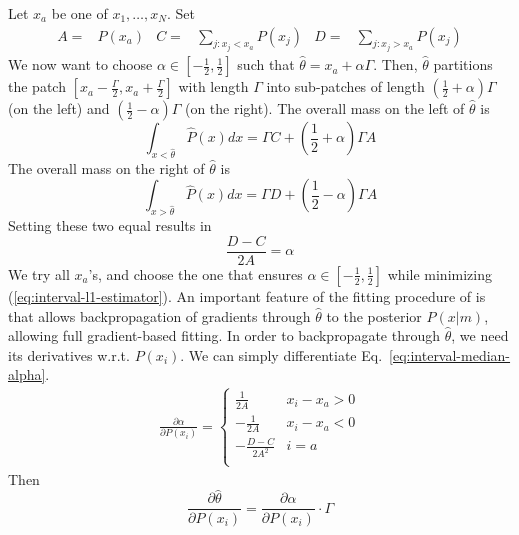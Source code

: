 Let $x_a$ be one of $x_1, \dots, x_N$.
Set
\begin{align*}
    A =& P(x_a) &
    C =& \sum_{j : x_j < x_a} P(x_j)&
    D =& \sum_{j : x_j>x_a} P(x_j)
\end{align*}
We now want to choose $\alpha \in [-\frac{1}{2},\frac{1}{2}]$ such that $\widehat{\theta} = x_a + \alpha\Gamma$.
Then, $\widehat{\theta}$ partitions the patch $[x_a-\frac{\Gamma}{2}, x_a+\frac{\Gamma}{2}]$ with length $\Gamma$ into sub-patches of length $(\frac{1}{2}+\alpha) \Gamma$ (on the left) and $(\frac{1}{2}-\alpha) \Gamma$ (on the right).
The overall mass on the left of $\widehat{\theta}$ is
\begin{equation}
  \int_{x<\widehat{\theta}} \widehat{P}(x) dx  =  \Gamma C + \left(\frac{1}{2}+\alpha\right) \Gamma A %
\end{equation}
The overall mass on the right of $\widehat{\theta}$ is
\begin{equation}
  \int_{x>\widehat{\theta}} \widehat{P}(x) dx =   \Gamma D + \left(\frac{1}{2}-\alpha\right) \Gamma A %
\end{equation}
Setting these two equal results in
\begin{equation}\label{eq:interval-median-alpha}
    \frac{D-C}{2A} =   \alpha
\end{equation}
We try all $x_a$'s, and choose the one that ensures $\alpha \in [-\frac{1}{2}, \frac{1}{2}]$ while minimizing (\ref{eq:interval-l1-estimator}). 
An important feature of the fitting procedure of \citet{hahn2024unifying} is that allows backpropagation of gradients through $\widehat{\theta}$ to the posterior $P(x|m)$, allowing full gradient-based fitting.
In order to backpropagate through $\widehat{\theta}$, we need its derivatives w.r.t. $P(x_i)$.
We can simply differentiate Eq.~\ref{eq:interval-median-alpha}.
\begin{align*}
    \frac{\partial \alpha}{\partial P(x_i)} = \begin{cases}
        \frac{1}{2A} & x_i-x_a > 0 \\
        -\frac{1}{2A} & x_i-x_a < 0 \\
      -\frac{D-C}{2A^2}  & i=a \\
    \end{cases}
\end{align*}
Then
\begin{equation}
    \frac{\partial \widehat{\theta}}{\partial P(x_i)} = \frac{\partial \alpha}{\partial P(x_i)} \cdot \Gamma
\end{equation}





